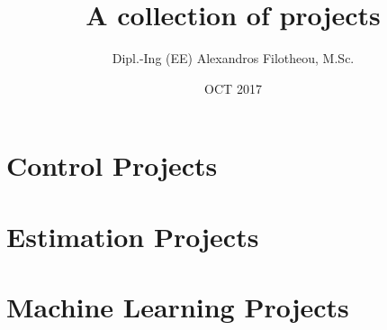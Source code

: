 \documentclass[11pt]{article}
\begin{document}
  \title{A collection of projects}
  \author{Dipl.-Ing (EE) Alexandros Filotheou, M.Sc.}
  \date{OCT 2017}
  \maketitle
  \vspace{5cm}

  \tableofcontents
  \thispagestyle{empty}
  \clearpage

  \section{Control Projects}
    
    
    

  \section{Estimation Projects}
    

  \section{Machine Learning Projects}
    
\end{document}
